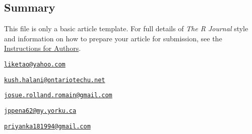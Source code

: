 \hypertarget{summary}{%
\subsection{Summary}\label{summary}}

This file is only a basic article template. For full details of
\emph{The R Journal} style and information on how to prepare your
article for submission, see the
\href{https://journal.r-project.org/share/author-guide.pdf}{Instructions
for Authors}.




\address{%
Ketao Li\\
York University\\
\\
}
\href{mailto:liketao@yahoo.com}{\nolinkurl{liketao@yahoo.com}}

\address{%
Kush Halani\\
York University\\
\\
}
\href{mailto:kush.halani@ontariotechu.net}{\nolinkurl{kush.halani@ontariotechu.net}}

\address{%
Josue Romain\\
York University\\
\\
}
\href{mailto:josue.rolland.romain@gmail.com}{\nolinkurl{josue.rolland.romain@gmail.com}}

\address{%
Juan Peña\\
York University\\
\\
}
\href{mailto:jppena62@my.yorku.ca}{\nolinkurl{jppena62@my.yorku.ca}}

\address{%
Priyanka Patil\\
York University\\
\\
}
\href{mailto:priyanka181994@gmail.com}{\nolinkurl{priyanka181994@gmail.com}}

